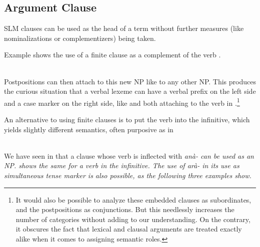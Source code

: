 \subsection{Argument Clause}\label{sec:nppp:ArgumentClause}
SLM clauses can be used as the head of a term without further measures (like nominalizations or complementizers) being taken.


Example  shows the use of a finite clause as a complement of the verb .

\\

Postpositions can then attach to this new NP like to any other NP. This produces the curious situation that a verbal lexeme can have a verbal prefix on the left side and a case marker on the right side, like   and  both attaching to the verb  in  .\footnote{It would also be possible to analyze these embedded clauses as subordinates, and the postpositions as conjunctions. But this needlessly increases the number of categories without adding to our understanding. On the contrary, it obscures the fact that lexical and clausal arguments are treated exactly alike when it comes to assigning semantic roles.}

An alternative to using finite clauses is to put the verb into the infinitive, which yields slightly different semantics, often purposive as in 


\\


We have seen in  that a clause whose verb is inflected with \em anà- \em can be used as an NP.  shows the same for a verb in the infinitive. The use of \em arà- \em in its use as simultaneous tense marker is also possible, as the following three examples show.



